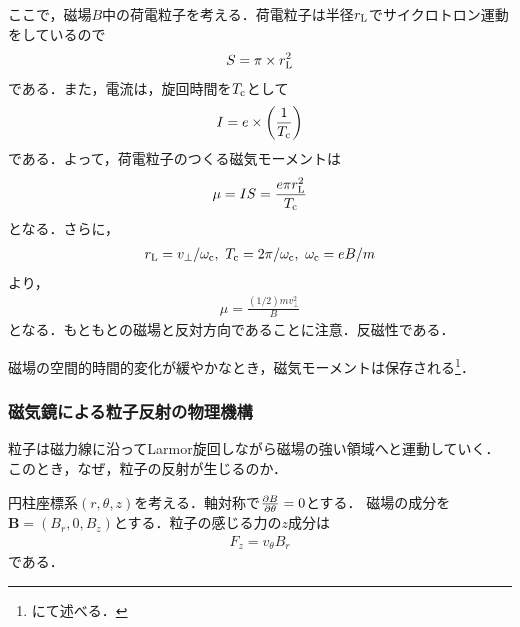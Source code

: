 \documentclass{report}
\begin{document}
        ここで，磁場$B$中の荷電粒子を考える．荷電粒子は半径$r_{\mathrm{L}}$でサイクロトロン運動をしているので
        \begin{align}
          S = \pi \times r_{\mathrm{L}}^2
        \end{align}
        である．また，電流は，旋回時間を$T_{\mathrm{c}}$として
        \begin{align}
          I = e \times \qty(\frac{1}{T_{\mathrm{c}}})
        \end{align}
        である．よって，荷電粒子のつくる磁気モーメントは
        \begin{align}
          \mu = IS = \frac{e\pi r_{\mathrm{L}}^2}{T_{\mathrm{c}}}
        \end{align}
        となる．さらに，
        \begin{align}
          r_{\mathrm{L}} = v_{\perp} / \omega_{\mathrm{c}},\ T_{\mathrm{c}} = 2\pi / \omega_{\mathrm{c}},\ \omega_{\mathrm{c}} = eB/m
        \end{align}
        より，
        \begin{align}
          \mu = \frac{(1/2)mv_{\perp}^2}{B} \label{magnetic-moment}
        \end{align}
        となる．もともとの磁場と反対方向であることに注意．反磁性である．

        磁場の空間的時間的変化が緩やかなとき，磁気モーメントは保存される\footnote{にて述べる．}．



      \subsubsection{磁気鏡による粒子反射の物理機構}
        粒子は磁力線に沿ってLarmor旋回しながら磁場の強い領域へと運動していく．このとき，なぜ，粒子の反射が生じるのか．

        円柱座標系$(r,\theta,z)$を考える．軸対称で$\pdv{B}{\theta} = 0$とする．
        磁場の成分を$\bm{B} = (B_r,0,B_z)$とする．粒子の感じる力の$z$成分は
        \begin{align}
          F_z = v_{\theta}B_r
        \end{align}
        である．
\end{document}
